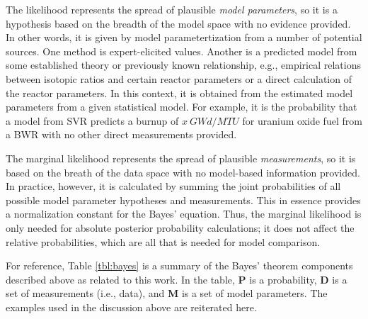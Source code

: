 The likelihood represents the spread of plausible \textit{model parameters}, so
it is a hypothesis based on the breadth of the model space with no evidence
provided.  In other words, it is given by model parametertization from a number
of potential sources.  One method is expert-elicited values.  Another is a
predicted model from some established theory or previously known relationship,
e.g., empirical relations between isotopic ratios and certain reactor
parameters or a direct calculation of the reactor parameters. In this context,
it is obtained from the estimated model parameters from a given statistical
model.  For example, it is the probability that a model from \gls{SVR} predicts
a burnup of $x\ GWd/MTU$ for uranium oxide fuel from a \gls{BWR} with no other
direct measurements provided.

The marginal likelihood represents the spread of plausible
\textit{measurements}, so it is based on the breath of the data space with no
model-based information provided.  In practice, however, it is calculated by
summing the joint probabilities of all possible model parameter hypotheses and
measurements. This in essence provides a normalization constant for the Bayes'
equation.  Thus, the marginal likelihood is only needed for absolute posterior
probability calculations; it does not affect the relative probabilities, which
are all that is needed for model comparison. \cite{inverse_theory,
bayes_compare}

For reference, Table \ref{tbl:bayes} is a summary of the Bayes' theorem
components described above as related to this work. In the table, \textbf{P} is
a probability, \textbf{D} is a set of measurements (i.e., data), and \textbf{M}
is a set of model parameters. The examples used in the discussion above are
reiterated here.

